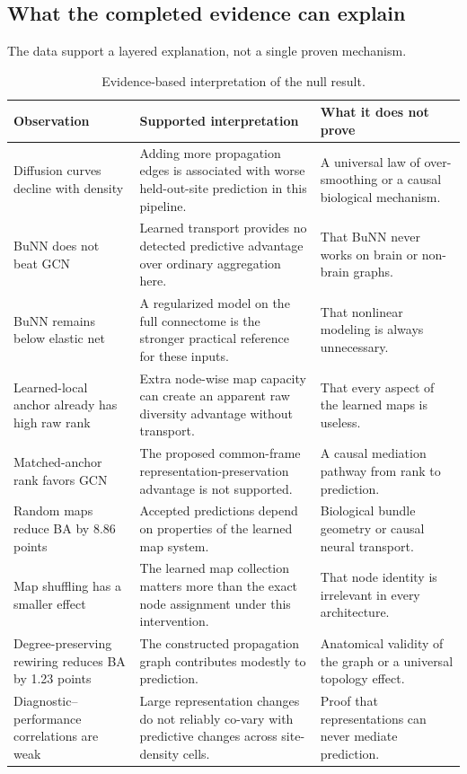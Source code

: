 \documentclass[11pt,a4paper]{article}
\begin{document}
\subsection{What the completed evidence can explain}

The data support a layered explanation, not a single proven mechanism.

\begin{table}[htbp]
\centering
\caption{Evidence-based interpretation of the null result.}
\label{tab:explanation}
\small
\begin{tabularx}{\textwidth}{@{}p{3.1cm}Y Y@{}}
\toprule
\textbf{Observation} & \textbf{Supported interpretation} & \textbf{What it does not prove} \\
\midrule
Diffusion curves decline with density & Adding more propagation edges is associated with worse held-out-site prediction in this pipeline. & A universal law of over-smoothing or a causal biological mechanism. \\
BuNN does not beat GCN & Learned transport provides no detected predictive advantage over ordinary aggregation here. & That BuNN never works on brain or non-brain graphs. \\
BuNN remains below elastic net & A regularized model on the full connectome is the stronger practical reference for these inputs. & That nonlinear modeling is always unnecessary. \\
Learned-local anchor already has high raw rank & Extra node-wise map capacity can create an apparent raw diversity advantage without transport. & That every aspect of the learned maps is useless. \\
Matched-anchor rank favors GCN & The proposed common-frame representation-preservation advantage is not supported. & A causal mediation pathway from rank to prediction. \\
Random maps reduce BA by 8.86 points & Accepted predictions depend on properties of the learned map system. & Biological bundle geometry or causal neural transport. \\
Map shuffling has a smaller effect & The learned map collection matters more than the exact node assignment under this intervention. & That node identity is irrelevant in every architecture. \\
Degree-preserving rewiring reduces BA by 1.23 points & The constructed propagation graph contributes modestly to prediction. & Anatomical validity of the graph or a universal topology effect. \\
Diagnostic--performance correlations are weak & Large representation changes do not reliably co-vary with predictive changes across site-density cells. & Proof that representations can never mediate prediction. \\

\end{tabularx}
\end{table}
\end{document}

